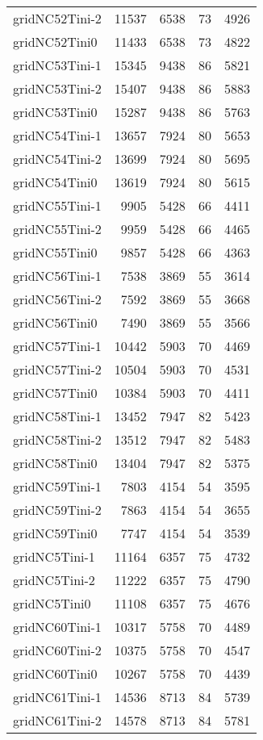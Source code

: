 \begin{longtable}{lrrrr}
gridNC52Tini-2 & 11537 & 6538 & 73 & 4926 \\
gridNC52Tini0 & 11433 & 6538 & 73 & 4822 \\
gridNC53Tini-1 & 15345 & 9438 & 86 & 5821 \\
gridNC53Tini-2 & 15407 & 9438 & 86 & 5883 \\
gridNC53Tini0 & 15287 & 9438 & 86 & 5763 \\
gridNC54Tini-1 & 13657 & 7924 & 80 & 5653 \\
gridNC54Tini-2 & 13699 & 7924 & 80 & 5695 \\
gridNC54Tini0 & 13619 & 7924 & 80 & 5615 \\
gridNC55Tini-1 & 9905 & 5428 & 66 & 4411 \\
gridNC55Tini-2 & 9959 & 5428 & 66 & 4465 \\
gridNC55Tini0 & 9857 & 5428 & 66 & 4363 \\
gridNC56Tini-1 & 7538 & 3869 & 55 & 3614 \\
gridNC56Tini-2 & 7592 & 3869 & 55 & 3668 \\
gridNC56Tini0 & 7490 & 3869 & 55 & 3566 \\
gridNC57Tini-1 & 10442 & 5903 & 70 & 4469 \\
gridNC57Tini-2 & 10504 & 5903 & 70 & 4531 \\
gridNC57Tini0 & 10384 & 5903 & 70 & 4411 \\
gridNC58Tini-1 & 13452 & 7947 & 82 & 5423 \\
gridNC58Tini-2 & 13512 & 7947 & 82 & 5483 \\
gridNC58Tini0 & 13404 & 7947 & 82 & 5375 \\
gridNC59Tini-1 & 7803 & 4154 & 54 & 3595 \\
gridNC59Tini-2 & 7863 & 4154 & 54 & 3655 \\
gridNC59Tini0 & 7747 & 4154 & 54 & 3539 \\
gridNC5Tini-1 & 11164 & 6357 & 75 & 4732 \\
gridNC5Tini-2 & 11222 & 6357 & 75 & 4790 \\
gridNC5Tini0 & 11108 & 6357 & 75 & 4676 \\
gridNC60Tini-1 & 10317 & 5758 & 70 & 4489 \\
gridNC60Tini-2 & 10375 & 5758 & 70 & 4547 \\
gridNC60Tini0 & 10267 & 5758 & 70 & 4439 \\
gridNC61Tini-1 & 14536 & 8713 & 84 & 5739 \\
gridNC61Tini-2 & 14578 & 8713 & 84 & 5781 \\

\end{longtable}
